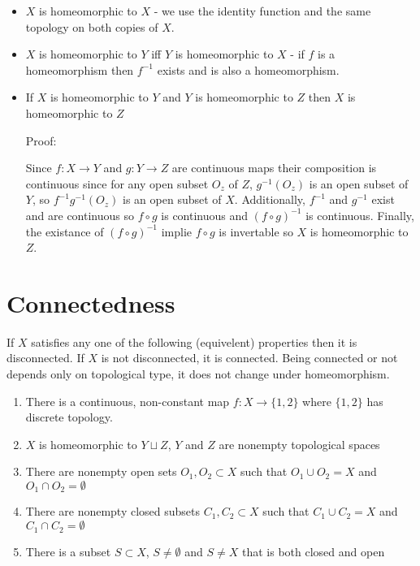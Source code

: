 \documentclass{homework}
\begin{document}
\begin{itemize}
    \item $X$ is homeomorphic to $X$ - we use the identity function and the same topology on both copies of $X$. 
    \item $X$ is homeomorphic to $Y$ iff $Y$ is homeomorphic to $X$ - if $f$ is a homeomorphism then $f^{-1}$ exists and is also a homeomorphism.
    \item If $X$ is homeomorphic to $Y$ and $Y$ is homeomorphic to $Z$ then $X$ is homeomorphic to $Z$ 
    
    Proof: 
    
    Since $f: X \rightarrow Y$ and $g: Y \rightarrow Z$ are continuous maps their composition is continuous since for any open subset $O_z$ of $Z$, $g^{-1}(O_z)$ is an open subset of $Y$, so $f^{-1}g^{-1}(O_z)$ is an open subset of $X$. Additionally, $f^{-1}$ and $g^{-1}$ exist and are continuous so $f \circ g$ is continuous and $(f \circ g)^{-1}$ is continuous. Finally, the existance of $(f \circ g)^{-1}$ implie $f \circ g$ is invertable so $X$ is homeomorphic to $Z$.

    

    
\end{itemize}


\section{Connectedness}

If $X$ satisfies any one of the following (equivelent) properties then it is disconnected. If $X$ is not disconnected, it is connected. Being connected or not depends only on topological type, it does not change under homeomorphism.

\begin{enumerate}
    \item There is a continuous, non-constant map $f:X \rightarrow \{1,2\}$ where $\{1,2\}$ has discrete topology.
    \item $X$ is homeomorphic to $Y \sqcup Z$, $Y$ and $Z$ are nonempty topological spaces
    \item {There are nonempty open sets $O_1,O_2 \subset X$ such that $O_1 \cup O_2 = X$ and $O_1 \cap O_2 = \emptyset$}
    \item {There are nonempty closed subsets $C_1,C_2 \subset X$ such that  $C_1 \cup C_2 = X$ and $C_1 \cap C_2 = \emptyset$}
    \item{There is a subset $S \subset X$, $S \neq \emptyset$ and $S \neq X$ that is both closed and open}
    
\end{enumerate}
\end{document}
